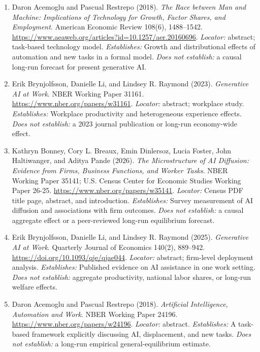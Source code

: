 \documentclass[11pt,a4paper]{article}
\begin{document}
\begin{enumerate}

\item[S1] Daron Acemoglu and Pascual Restrepo (2018). \emph{The Race between Man and Machine: Implications of Technology for Growth, Factor Shares, and Employment}. American Economic Review 108(6), 1488--1542. \url{https://www.aeaweb.org/articles?id=10.1257/aer.20160696}. \textit{Locator:} abstract; task-based technology model. \textit{Establishes:} Growth and distributional effects of automation and new tasks in a formal model. \textit{Does not establish:} a causal long-run forecast for present generative AI.

\item[S2] Erik Brynjolfsson, Danielle Li, and Lindsey R. Raymond (2023). \emph{Generative AI at Work}. NBER Working Paper 31161. \url{https://www.nber.org/papers/w31161}. \textit{Locator:} abstract; workplace study. \textit{Establishes:} Workplace productivity and heterogeneous experience effects. \textit{Does not establish:} a 2023 journal publication or long-run economy-wide effect.

\item[S3] Kathryn Bonney, Cory L. Breaux, Emin Dinlersoz, Lucia Foster, John Haltiwanger, and Aditya Pande (2026). \emph{The Microstructure of AI Diffusion: Evidence from Firms, Business Functions, and Worker Tasks}. NBER Working Paper 35141; U.S. Census Center for Economic Studies Working Paper 26-25. \url{https://www.nber.org/papers/w35141}. \textit{Locator:} Census PDF title page, abstract, and introduction. \textit{Establishes:} Survey measurement of AI diffusion and associations with firm outcomes. \textit{Does not establish:} a causal aggregate effect or a peer-reviewed long-run equilibrium forecast.

\item[S4] Erik Brynjolfsson, Danielle Li, and Lindsey R. Raymond (2025). \emph{Generative AI at Work}. Quarterly Journal of Economics 140(2), 889--942. \url{https://doi.org/10.1093/qje/qjae044}. \textit{Locator:} abstract; firm-level deployment analysis. \textit{Establishes:} Published evidence on AI assistance in one work setting. \textit{Does not establish:} aggregate productivity, national labor shares, or long-run welfare effects.

\item[S5] Daron Acemoglu and Pascual Restrepo (2018). \emph{Artificial Intelligence, Automation and Work}. NBER Working Paper 24196. \url{https://www.nber.org/papers/w24196}. \textit{Locator:} abstract. \textit{Establishes:} A task-based framework explicitly discussing AI, displacement, and new tasks. \textit{Does not establish:} a long-run empirical general-equilibrium estimate.

\end{enumerate}
\end{document}
